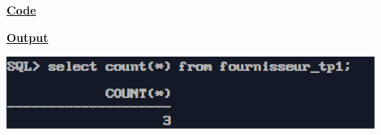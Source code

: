 \newpage
{}

\textbf{\underline{Code}}


\vspace{1cm}
\textbf{\underline{Output}}
\vspace{1cm}
\begin{center}
    \includegraphics[width=0.9\textwidth]{Questions/q25/q25.png}
\end{center}



